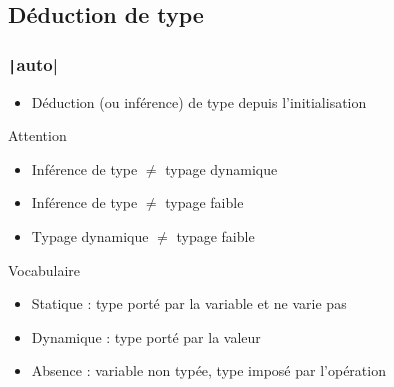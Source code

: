 \documentclass[C++.tex]{subfiles}
\begin{document}
\subsection*{Déduction de type}
\begin{frame}[fragile]
	\frametitle{\texttt|auto|}
	\begin{itemize}
		\item Déduction (ou inférence) de type depuis l'initialisation

	\end{itemize}

	\begin{alertblock}{Attention}
		\begin{itemize}
			\item Inférence de type $\neq$ typage dynamique
			\item Inférence de type $\neq$ typage faible
			\item Typage dynamique $\neq$ typage faible
		\end{itemize}
	\end{alertblock}

	\begin{block}{Vocabulaire}
		\begin{itemize}
			\item Statique : type porté par la variable et ne varie pas
			\item Dynamique : type porté par la valeur
			\item Absence : variable non typée, type imposé par l'opération
		\end{itemize}
	\end{block}

\end{frame}
\end{document}

